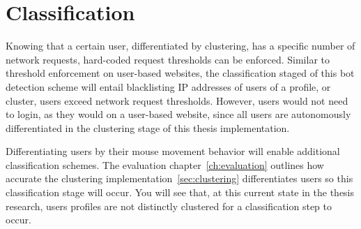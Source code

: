 
\section{Classification}\label{sec:classification}
Knowing that a certain user, differentiated by clustering, has a specific number of network requests, hard-coded request thresholds can be enforced.
Similar to threshold enforcement on user-based websites, the classification staged of this bot detection scheme will entail blacklisting IP addresses of users of a profile, or cluster, users exceed network request thresholds.
However, users would not need to login, as they would on a user-based website, since all users are autonomously differentiated in the clustering stage of this thesis implementation.

Differentiating users by their mouse movement behavior will enable additional classification schemes.
The evaluation chapter~\ref{ch:evaluation} outlines how accurate the clustering implementation~\ref{sec:clustering} differentiates users so this classification stage will occur.
You will see that, at this current state in the thesis research, users profiles are not distinctly clustered for a classification step to occur.
